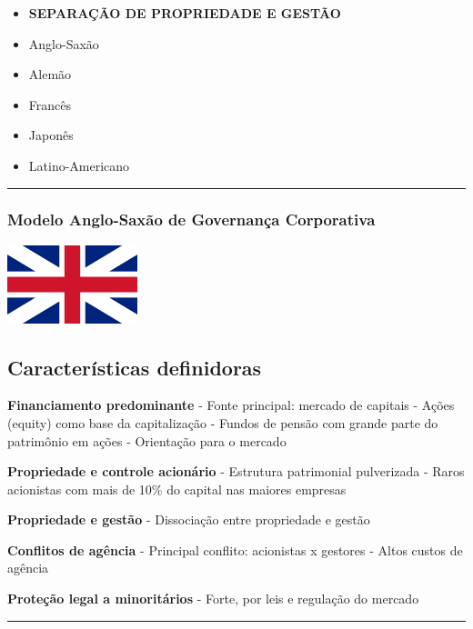 \documentclass[
]{book}
\begin{document}
\begin{itemize}
\item
  \textbf{SEPARAÇÃO DE PROPRIEDADE E GESTÃO}
\item
  Anglo-Saxão
\item
  Alemão
\item
  Francês
\item
  Japonês
\item
  Latino-Americano
\end{itemize}

\begin{center}\rule{0.5\linewidth}{0.5pt}\end{center}

\subsubsection{Modelo Anglo-Saxão de Governança Corporativa}\label{modelo-anglo-saxuxe3o-de-governanuxe7a-corporativa}

\includegraphics[width=1.48958in,height=\textheight]{images/02-2025-08-12_13/06-modelo_anglo-saxao.jpg}

\subsection{Características definidoras}\label{caracteruxedsticas-definidoras}

\textbf{Financiamento predominante} - Fonte principal: mercado de capitais - Ações (equity) como base da capitalização - Fundos de pensão com grande parte do patrimônio em ações - Orientação para o mercado

\textbf{Propriedade e controle acionário} - Estrutura patrimonial pulverizada - Raros acionistas com mais de 10\% do capital nas maiores empresas

\textbf{Propriedade e gestão} - Dissociação entre propriedade e gestão

\textbf{Conflitos de agência} - Principal conflito: acionistas x gestores - Altos custos de agência

\textbf{Proteção legal a minoritários} - Forte, por leis e regulação do mercado

\begin{center}\rule{0.5\linewidth}{0.5pt}\end{center}
\end{document}
